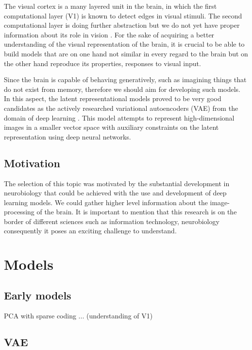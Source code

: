 \documentclass[11pt, english]{article}
\begin{document}
\par  The visual cortex is a many layered unit in the brain, in which the first computational layer (V1) is known to detect edges in visual stimuli.
The second computational layer is doing further abstraction but we do not yet
have proper information about its role in vision \cite{ZiembaV2}. For the sake of acquiring a
better understanding of the visual representation of the brain, it is crucial to be able to build models that are on one hand not similar in every regard to the brain but on the other hand reproduce its properties, responses to visual input.
\par Since the brain is capable of behaving generatively, such as imagining things that do not exist from memory, therefore we should aim for developing such models. In this aspect, the latent representational models proved to be very good candidates as the actively researched variational autoencoders (VAE) from the domain of deep learning \cite{kingma2013auto}. This model attempts to represent high-dimensional images in a smaller vector space with auxiliary constraints on the latent representation using deep neural networks.

\subsection{Motivation}

\par The selection of this topic was motivated by the substantial development in neurobiology that could be achieved with the use and development of deep learning models. We could gather higher level information about the image-processing of the brain. It is important to mention that this research is on the border of different sciences such as information technology, neurobiology consequently it poses an exciting challenge to understand.

\section{Models}

\subsection{Early models}

\par PCA with sparse coding \cite{olshausen1996emergence} ... (understanding of V1)

\subsection{VAE}
\end{document}
